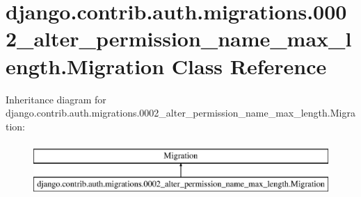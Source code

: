 \hypertarget{classdjango_1_1contrib_1_1auth_1_1migrations_1_10002__alter__permission__name__max__length_1_1_migration}{}\section{django.\+contrib.\+auth.\+migrations.0002\+\_\+alter\+\_\+permission\+\_\+name\+\_\+max\+\_\+length.Migration Class Reference}
\label{classdjango_1_1contrib_1_1auth_1_1migrations_1_10002__alter__permission__name__max__length_1_1_migration}
Inheritance diagram for django.\+contrib.\+auth.\+migrations.0002\+\_\+alter\+\_\+permission\+\_\+name\+\_\+max\+\_\+length.Migration\+:\begin{figure}[H]
\begin{center}
\leavevmode
\includegraphics[height=2.000000cm]{classdjango_1_1contrib_1_1auth_1_1migrations_1_10002__alter__permission__name__max__length_1_1_migration}
\end{center}
\end{figure}
